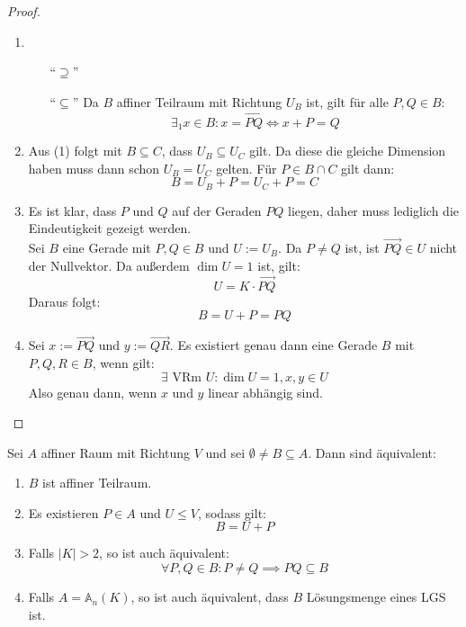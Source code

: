 \documentclass[parskip,a4paper,twoside,DIV15,BCOR12mm]{scrbook}
\begin{document}
\begin{proof}
\begin{enumerate}
\item 
\begin{enumerate}
\item["`$\supseteq$"']\checkmark
\item["`$\subseteq$"'] Da $B$ affiner Teilraum mit Richtung $U_B$ ist, gilt für alle $P,Q\in B$:
\[\exists_1 x\in B: x=\overrightarrow{PQ} \iff x+P = Q\]
\end{enumerate}
\item Aus (1) folgt mit $B\subseteq C$, dass $U_B\subseteq U_C$ gilt. Da diese die
gleiche Dimension haben muss dann schon $U_B=U_C$ gelten. Für $P\in B\cap C$ gilt dann:
\[B=U_B+P=U_C+P=C\]
\item Es ist klar, dass $P$ und $Q$ auf der Geraden $PQ$ liegen, daher muss lediglich die
Eindeutigkeit gezeigt werden.\\
Sei $B$ eine Gerade mit $P,Q\in B$ und $U:=U_B$. Da $P\ne Q$ ist, 
ist $\overrightarrow{PQ}\in U$ nicht der Nullvektor. Da außerdem $\dim U=1$ ist, gilt:
\[U=K\cdot\overrightarrow{PQ}\]
Daraus folgt:
\[B=U+P=PQ\]
\item Sei $x:=\overrightarrow{PQ}$ und $y:=\overrightarrow{QR}$. Es existiert genau dann
eine Gerade $B$ mit $P,Q,R\in B$, wenn gilt:
\[\exists\text{ VRm }U: \dim U=1, x,y\in U\]
Also genau dann, wenn $x$ und $y$ linear abhängig sind.
\end{enumerate}
\end{proof}

\begin{theo}[Teilraumkriterium]
\label{Satz 20.1}
Sei $A$ affiner Raum mit Richtung $V$ und sei $\emptyset \ne B\subseteq A$. Dann 
sind äquivalent:
\begin{enumerate}
\item $B$ ist affiner Teilraum.
\item Es existieren $P\in A$ und $U\le V$, sodass gilt:
\[B=U+P\]
\item Falls $|K| >2$, so ist auch äquivalent:
\[\forall P,Q\in B: P\ne Q \implies PQ \subseteq B\]
\item Falls $A=\mathbb{A}_n(K)$, so ist auch äquivalent, dass $B$ Lösungsmenge eines LGS ist.
\end{enumerate}
\end{theo}
\end{document}
